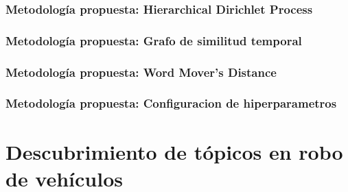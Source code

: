 \documentclass[
	spanish, %
	aspectratio=43, %
	hyperref={pdfencoding=auto,psdextra},
	xcolor={dvipsnames,table,usenames}
]{beamer}
\begin{document}
\begin{frame}

\frametitle{Metodología propuesta: Hierarchical Dirichlet Process}

\end{frame}




\begin{frame}

\frametitle{Metodología propuesta: Grafo de similitud temporal}

\end{frame}




\begin{frame}

\frametitle{Metodología propuesta: Word Mover's Distance}

\end{frame}

\begin{frame}

\frametitle{Metodología propuesta: Configuracion de hiperparametros}

\end{frame}



\section{Descubrimiento de tópicos en robo de vehículos}


\begin{frame}

\frametitle{}

\end{frame}


\begin{frame}

\frametitle{}

\end{frame}


\begin{frame}

\frametitle{}

\end{frame}



\begin{frame}

\frametitle{}

\end{frame}

\begin{frame}

\frametitle{}

\end{frame}
\end{document}
